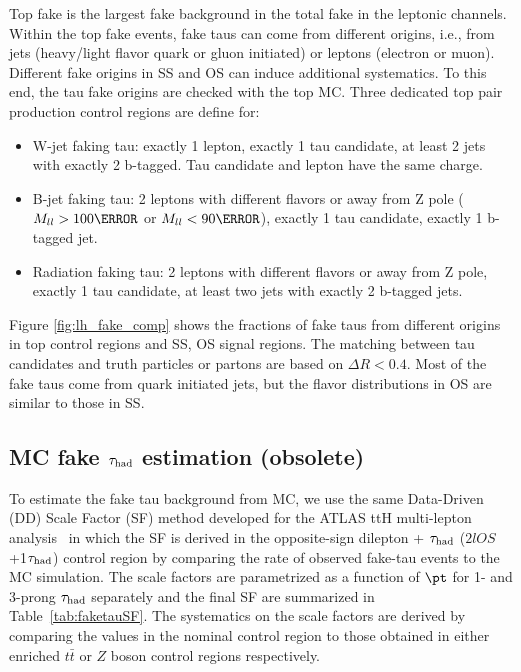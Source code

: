 Top fake is the largest fake background in the total fake in the leptonic channels. 
Within the top fake events, fake taus can come from different origins, i.e., from jets (heavy/light flavor quark or gluon initiated) 
or leptons (electron or muon). Different fake origins in SS and OS can induce additional systematics. To this end, the tau fake 
origins are checked with the top MC. Three dedicated top pair production control regions are define for:
\begin{itemize}
\item{W-jet faking tau: exactly 1 lepton, exactly 1 tau candidate, at least 2 jets with exactly 2 b-tagged. Tau candidate and lepton have the same charge.}
\item{B-jet faking tau: 2 leptons with different flavors or away from Z pole ($M_{ll}>100\GeV$ or $M_{ll}<90\GeV$), exactly 1 tau candidate, exactly 1 b-tagged jet.}
\item{Radiation faking tau: 2 leptons with different flavors or away from Z pole, exactly 1 tau candidate, at least two jets with exactly 2 b-tagged jets.}
\end{itemize}
Figure \ref{fig:lh_fake_comp} shows the fractions of fake taus from different 
origins in top control regions and SS, OS signal regions. The matching between tau candidates and truth particles or partons are based on $\Delta R<0.4$. 
Most of the fake taus come from quark initiated jets, but the flavor distributions in OS are similar to those in SS. 



\subsection{MC fake $\tau_\text{had}$ estimation (obsolete)}
\label{sec:sf_method_obsolete}

To estimate the fake tau background from MC, we use the same Data-Driven (DD) Scale Factor (SF) method developed for the ATLAS 
ttH multi-lepton analysis~\cite{ATL-COM-PHYS-2018-410} 
in which the SF is derived in the opposite-sign dilepton + $\tau_\text{had}$ ($2lOS$+1$\tau_\text{had}$) control region by comparing the rate of observed fake-tau events to 
the MC simulation. The scale factors are parametrized as a function of $\pt$ for 1- and 3-prong $\tau_\text{had}$ separately and the final 
SF are summarized in Table~\ref{tab:faketauSF}. The systematics on the scale factors are derived by comparing the values in the nominal control region to
those obtained in either enriched $t\bar t$ or $Z$ boson control regions respectively.

